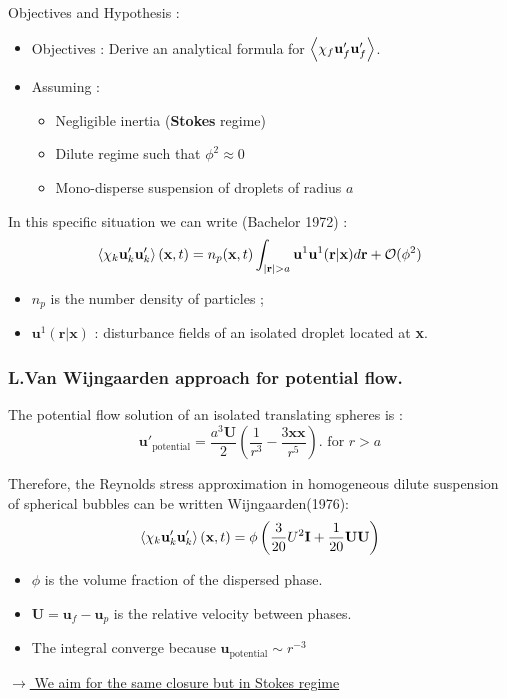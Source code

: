 \documentclass{sintefbeamer}
\begin{document}
\begin{frame}{Objectives and Hypothesis :}
  \begin{itemize}
    \item Objectives :
    Derive an analytical formula for $\left<\chi_f \textbf{u}_f'\textbf{u}_f'\right>$. 
    \item Assuming : 
    \begin{itemize}
      \item Negligible inertia (\textbf{Stokes} regime)
      \item Dilute regime such that $\phi^{2} \approx 0$ 
      \item Mono-disperse suspension of droplets of radius $a$
    \end{itemize}
  \end{itemize}

  
  In this specific situation we can write  (Bachelor 1972) :
  \begin{equation*}
    \left<\chi_k \textbf{u}'_k\textbf{u}'_k\right>(\textbf{x},t)
    = 
    n_p(\textbf{x},t)
    \int_{|\textbf{r}| > a }
     \textbf{u}^1\textbf{u}^1(\textbf{r}|\textbf{x}) d\textbf{r}
    +\mathcal{O}(\phi^2)
\end{equation*}

\begin{itemize}
  \item $n_p$ is the number density of particles ;
  \item $\textbf{u}^1(\textbf{r}|\textbf{x})$ : disturbance fields of an isolated droplet located at \textbf{x}. 
\end{itemize}
\end{frame}

\begin{frame}
  \frametitle{L.Van Wijngaarden approach for potential flow.}

The potential flow solution of an isolated translating spheres is :
\begin{equation*}
  \textbf{u}'_\text{potential}
  = \frac{a^3 \textbf{U}}{2}\left(\frac{1}{r^3} - \frac{3 \textbf{xx}}{r^5}\right).
  \text{    for    }r>a
\end{equation*}

Therefore, the Reynolds stress approximation in homogeneous dilute suspension of spherical bubbles can be written Wijngaarden(1976): 
  \begin{align*}
    \left<\chi_k \textbf{u}'_k\textbf{u}'_k\right>(\textbf{x},t)
    = \phi \left(\frac{3}{20} U^2\textbf{I} + \frac{1}{20}\textbf{UU} \right)
\end{align*}


\begin{itemize}
  \item $\phi$ is the volume fraction of the dispersed phase. 
  \item $\textbf{U} = \textbf{u}_f-\textbf{u}_p$ is the relative velocity between phases. 
  \item The integral converge because $\textbf{u}_\text{potential}  \sim r^{-3}$
\end{itemize}

\underline{$\to$ We aim for the same closure but in Stokes regime}

\end{frame}
\end{document}
